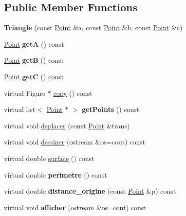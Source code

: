\subsection*{Public Member Functions}
\begin{DoxyCompactItemize}
\item 
{\bfseries Triangle} (const \hyperlink{class_point}{Point} \&a, const \hyperlink{class_point}{Point} \&b, const \hyperlink{class_point}{Point} \&c)\hypertarget{class_triangle_ad6736ceb2c5266d5654dc3e4dd6f5970}{}\label{class_triangle_ad6736ceb2c5266d5654dc3e4dd6f5970}

\item 
\hyperlink{class_point}{Point} {\bfseries getA} () const \hypertarget{class_triangle_a0dd6b0a5142764a033f8a2e4b9ced5c0}{}\label{class_triangle_a0dd6b0a5142764a033f8a2e4b9ced5c0}

\item 
\hyperlink{class_point}{Point} {\bfseries getB} () const \hypertarget{class_triangle_a1545c8812ce00318e49bd52e09d1e36a}{}\label{class_triangle_a1545c8812ce00318e49bd52e09d1e36a}

\item 
\hyperlink{class_point}{Point} {\bfseries getC} () const \hypertarget{class_triangle_a90c102c6b76c5feb2eaae27dd915dd4e}{}\label{class_triangle_a90c102c6b76c5feb2eaae27dd915dd4e}

\item 
virtual Figure $\ast$ \hyperlink{class_triangle_a42c97326207e09bf7d12f7a4b9fcd6d6}{copy} () const 
\item 
virtual list$<$ \hyperlink{class_point}{Point} $\ast$ $>$ {\bfseries get\+Points} () const \hypertarget{class_triangle_a301429604bdca0fb95b7b7bdda6184d6}{}\label{class_triangle_a301429604bdca0fb95b7b7bdda6184d6}

\item 
virtual void \hyperlink{class_triangle_ae44ae5995bcaba3cad9ca65a5ed14388}{deplacer} (const \hyperlink{class_point}{Point} \&trans)
\item 
virtual void \hyperlink{class_triangle_a7f91e70e78e8c296bae4f05c1788b051}{dessiner} (ostream \&os=cout) const 
\item 
virtual double \hyperlink{class_triangle_a621e89fd52c211202fa6109dcac3642e}{surface} () const 
\item 
virtual double {\bfseries perimetre} () const \hypertarget{class_triangle_a192e152f061780fee4b5680d689467aa}{}\label{class_triangle_a192e152f061780fee4b5680d689467aa}

\item 
virtual double {\bfseries distance\+\_\+origine} (const \hyperlink{class_point}{Point} \&p) const \hypertarget{class_triangle_a5d45ebaa6965729aa9956b28d5bf20d4}{}\label{class_triangle_a5d45ebaa6965729aa9956b28d5bf20d4}

\item 
virtual void {\bfseries afficher} (ostream \&os=cout) const \hypertarget{class_triangle_adb39ffbcfa9a0c1b8e24da01abc51bda}{}\label{class_triangle_adb39ffbcfa9a0c1b8e24da01abc51bda}

\end{DoxyCompactItemize}

